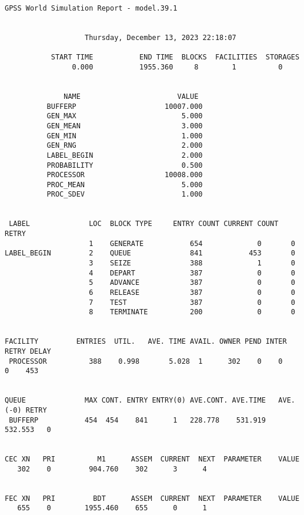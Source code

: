 \begin{lstlisting}[caption={Отчет о работе системы}]
              GPSS World Simulation Report - model.39.1


                   Thursday, December 13, 2023 22:18:07  

           START TIME           END TIME  BLOCKS  FACILITIES  STORAGES
                0.000           1955.360     8        1          0


              NAME                       VALUE  
          BUFFERP                     10007.000
          GEN_MAX                         5.000
          GEN_MEAN                        3.000
          GEN_MIN                         1.000
          GEN_RNG                         2.000
          LABEL_BEGIN                     2.000
          PROBABILITY                     0.500
          PROCESSOR                   10008.000
          PROC_MEAN                       5.000
          PROC_SDEV                       1.000


 LABEL              LOC  BLOCK TYPE     ENTRY COUNT CURRENT COUNT RETRY
                    1    GENERATE           654             0       0
LABEL_BEGIN         2    QUEUE              841           453       0
                    3    SEIZE              388             1       0
                    4    DEPART             387             0       0
                    5    ADVANCE            387             0       0
                    6    RELEASE            387             0       0
                    7    TEST               387             0       0
                    8    TERMINATE          200             0       0


FACILITY         ENTRIES  UTIL.   AVE. TIME AVAIL. OWNER PEND INTER RETRY DELAY
 PROCESSOR          388    0.998       5.028  1      302    0    0     0    453


QUEUE              MAX CONT. ENTRY ENTRY(0) AVE.CONT. AVE.TIME   AVE.(-0) RETRY
 BUFFERP           454  454    841      1   228.778    531.919    532.553   0


CEC XN   PRI          M1      ASSEM  CURRENT  NEXT  PARAMETER    VALUE
   302    0         904.760    302      3      4


FEC XN   PRI         BDT      ASSEM  CURRENT  NEXT  PARAMETER    VALUE
   655    0        1955.460    655      0      1
\end{lstlisting}

